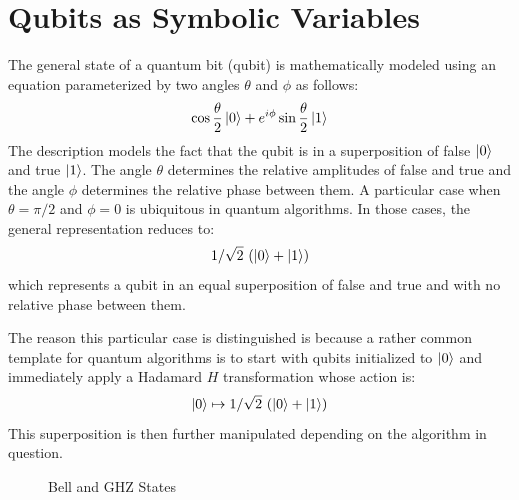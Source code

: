 \documentclass[sigplan,screen]{acmart}
\theoremstyle{definition}
\begin{document}
\section{Qubits as Symbolic Variables}
\label{sec2}

The general state of a quantum bit (qubit) is mathematically modeled
using an equation parameterized by two angles $\theta$ and $\phi$ as
follows:
\[
\cos{\frac{\theta}{2}} \ket{0} + e^{i\phi} \sin{\frac{\theta}{2}} \ket{1}
\]
The description models the fact that the qubit is in a superposition
of false $\ket{0}$ and true $\ket{1}$. The angle $\theta$
determines the relative amplitudes of false and true and the angle
$\phi$ determines the relative phase between them. A particular case
when $\theta = \pi/2$ and $\phi=0$ is ubiquitous in quantum
algorithms. In those cases, the general representation reduces to:
\[
1/\sqrt{2}~ (\ket{0} + \ket{1} )
\]
which represents a qubit in an equal superposition of false and
true and with no relative phase between them.

The reason this particular case is distinguished is because a rather
common template for quantum algorithms is to start with qubits
initialized to $\ket{0}$ and immediately apply a Hadamard $H$ transformation
whose action is:
\[
  \ket{0} \mapsto 1/\sqrt{2} ~(\ket{0} + \ket{1})
\]
This superposition is then further manipulated depending on the
algorithm in question.

\begin{figure}[t]
\begin{center}
\qquad\qquad
{}
\end{center}
\caption{\label{fig:bell2}Bell and GHZ States}
\end{figure}
\end{document}
